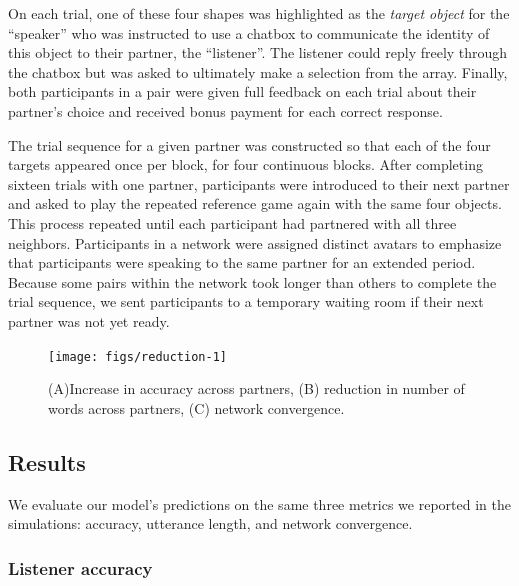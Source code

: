\documentclass[10pt, letterpaper]{article}
\newenvironment{CodeChunk}{}{}
\begin{document}
On each trial, one of these four shapes was highlighted as the
\emph{target object} for the ``speaker'' who was instructed to use a
chatbox to communicate the identity of this object to their partner, the
``listener''. The listener could reply freely through the chatbox but
was asked to ultimately make a selection from the array. Finally, both
participants in a pair were given full feedback on each trial about
their partner's choice and received bonus payment for each correct
response.

The trial sequence for a given partner was constructed so that each of
the four targets appeared once per block, for four continuous blocks.
After completing sixteen trials with one partner, participants were
introduced to their next partner and asked to play the repeated
reference game again with the same four objects. This process repeated
until each participant had partnered with all three neighbors.
Participants in a network were assigned distinct avatars to emphasize
that participants were speaking to the same partner for an extended
period. Because some pairs within the network took longer than others to
complete the trial sequence, we sent participants to a temporary waiting
room if their next partner was not yet ready.

\begin{CodeChunk}
\begin{figure}[t!]

{\centering \texttt{[image: figs/reduction-1]} 

}

\caption{\label{fig:results}(A)Increase in accuracy across partners, (B) reduction in number of words across partners, (C) network convergence.}\label{fig:reduction}
\end{figure}
\end{CodeChunk}

\hypertarget{results}{%
\subsection{Results}\label{results}}

We evaluate our model's predictions on the same three metrics we
reported in the simulations: accuracy, utterance length, and network
convergence.

\hypertarget{listener-accuracy}{%
\subsubsection{Listener accuracy}\label{listener-accuracy}}
\end{document}
